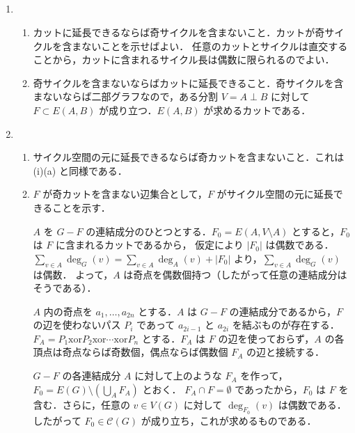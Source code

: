 \subsection{}
\begin{enumerate}
 \item
 \begin{enumerate}
  \item カットに延長できるならば奇サイクルを含まないこと．カットが奇サイクルを含まないことを示せばよい．
  任意のカットとサイクルは直交することから，カットに含まれるサイクル長は偶数に限られるのでよい．
  \item 奇サイクルを含まないならばカットに延長できること．奇サイクルを含まないならば二部グラフなので，ある分割 $V=A\perp B$ に対して
  $F\subset E(A,B)$ が成り立つ．$E(A,B)$ が求めるカットである．
 \end{enumerate}
 \item
 \begin{enumerate}
  \item サイクル空間の元に延長できるならば奇カットを含まないこと．これは (i)(a) と同様である．
  \item $F$ が奇カットを含まない辺集合として，$F$ がサイクル空間の元に延長できることを示す．
  
  $A$ を $G-F$ の連結成分のひとつとする．$F_0 = E(A,V\setminus A)$ とすると，$F_0$ は $F$ に含まれるカットであるから，
  仮定により $|F_0|$ は偶数である．$\sum_{v\in A} \deg_G(v) = \sum_{v\in A} \deg_{A}(v) + |F_0|$  より，$\sum_{v\in A}\deg_G(v)$ は偶数．
  よって，$A$ は奇点を偶数個持つ（したがって任意の連結成分はそうである）．
  
  $A$ 内の奇点を $a_1,\ldots, a_{2n}$ とする．$A$ は $G-F$ の連結成分であるから，$F$ の辺を使わないパス $P_i$ であって $a_{2i-1}$ と $a_{2i}$ を結ぶものが存在する．
  $F_A = P_1 \mathrm{xor} P_2 \mathrm{xor} \cdots \mathrm{xor} P_n$ とする．$F_A$ は $F$ の辺を使っておらず，$A$ の各頂点は奇点ならば奇数個，偶点ならば偶数個 $F_A$ の辺と接続する．
  
  $G-F$ の各連結成分 $A$ に対して上のような $F_A$ を作って，$F_0 = E(G)\setminus (\bigcup_{A}F_A)$ とおく．
  $F_A \cap F = \emptyset$ であったから，$F_0$ は $F$ を含む．さらに，任意の $v\in V(G)$ に対して $\deg_{F_0}(v)$ は偶数である．したがって $F_0\in \mathcal{C}(G)$ が成り立ち，これが求めるものである．
 \end{enumerate}
\end{enumerate}